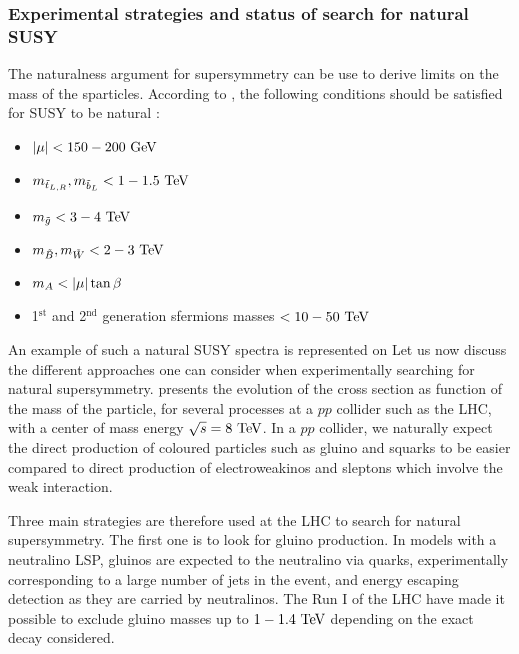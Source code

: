         \subsubsection{Experimental strategies and status of search for natural SUSY}

        The naturalness argument for supersymmetry can be use to derive limits on the mass
        of the sparticles. According to \cite{NaturalSUSYAndDarkMatter}, the following
        conditions should be satisfied for SUSY to be natural :
        \begin{itemize}
            \item $\left| \mu \right| < 150-200 ~\text{GeV}$
            \item $m_{\tilde{t}_{L,R}}, m_{\tilde{b}_L} < 1-1.5~\text{TeV}$
            \item $m_{\tilde{g}} < 3-4~\text{TeV}$
            \item $m_{\tilde{B}}, m_{\tilde{W}} < 2-3~\text{TeV}$
            \item $m_{A} < \left| \mu \right| \tan \beta$
            \item 1$^\text{st}$ and 2$^\text{nd}$ generation sfermions masses $< 10-50~\text{TeV}$
        \end{itemize}



        An example of such a natural SUSY spectra is represented on 
        Let us now discuss the different approaches one can consider when experimentally
        searching for natural supersymmetry.  presents the evolution
        of the cross section as function of the mass of the particle, for several processes
        at a $pp$ collider such as the LHC, with a center of mass energy $\sqrt{s} = 8~\text{TeV}$.
        In a $pp$ collider, we naturally expect the direct production of coloured particles
        such as gluino and squarks to be easier compared to direct production of electroweakinos
        and sleptons which involve the weak interaction.

        Three main strategies are therefore used at the LHC to search for natural supersymmetry.
        The first one is to look for gluino production. In models with a neutralino LSP, gluinos
        are expected to the neutralino via quarks, experimentally corresponding to a large number
        of jets in the event, and energy escaping detection as they are carried by neutralinos.
        The Run I of the LHC have made it possible to exclude gluino masses up to $1-1.4~\text{TeV}$
        depending on the exact decay considered.

